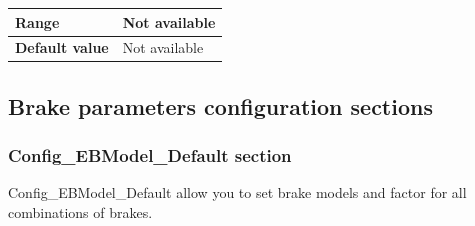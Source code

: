\begin{itemize}
\begin{longtable}{|l|l|}
				\hline

					\begin{minipage}[t]{0.22\linewidth} \textbf{Range}	\end{minipage}
				&	\begin{minipage}[t]{0.78\linewidth} Not available \end{minipage} \\

				\hline

					\begin{minipage}[t]{0.22\linewidth} \textbf{Default value}	\end{minipage}
				&	\begin{minipage}[t]{0.78\linewidth} Not available \end{minipage} \\

				\hline
			\end{longtable}
	\end{itemize}
	
\subsection{Brake parameters configuration sections}

	\subsubsection{Config\_EBModel\_Default section}
	
	Config\_EBModel\_Default allow you to set brake models and factor for all combinations of brakes.
	
